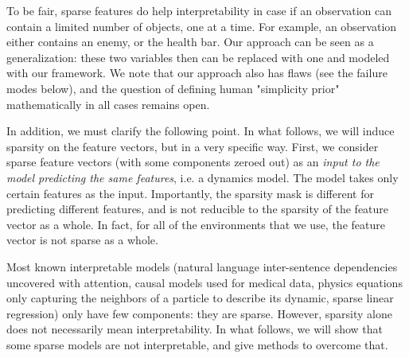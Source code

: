\documentclass[a4paper,11pt,oneside]{report}
\begin{document}
To be fair, sparse features do help interpretability in case if an observation can contain a limited number of objects, one at a time. For example, an observation either contains an enemy, or the health bar. Our approach can be seen as a generalization: these two variables then can be replaced with one and modeled with our framework. We note that our approach also has flaws (see the failure modes below), and the question of defining human "simplicity prior" mathematically in all cases remains open.

In addition, we must clarify the following point. In what follows, we will induce sparsity on the feature vectors, but in a very specific way. First, we consider sparse feature vectors (with some components zeroed out) as an {\em input to the model predicting the same features}, i.e. a dynamics model. The model takes only certain features as the input. Importantly, the sparsity mask is different for predicting different features, and is not reducible to the sparsity of the feature vector as a whole. In fact, for all of the environments that we use, the feature vector is not sparse as a whole.

Most known interpretable models (natural language inter-sentence dependencies uncovered with attention, causal models used for medical data, physics equations only capturing the neighbors of a particle to describe its dynamic, sparse linear regression) only have few components: they are sparse. However, sparsity alone does not necessarily mean interpretability. In what follows, we will show that some sparse models are not interpretable, and give methods to overcome that.
\end{document}
